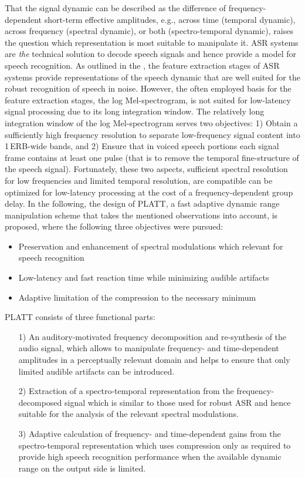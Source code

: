 \documentclass[10pt,a4paper,twocolumn]{article}
\begin{document}
That the signal dynamic can be described as the difference of frequency-dependent short-term effective amplitudes, e.g., across time (temporal dynamic), across frequency (spectral dynamic), or both (spectro-temporal dynamic), raises the question which representation is most suitable to manipulate it.
%
ASR systems are \emph{the} technical solution to decode speech signals and hence provide a model for speech recognition.
%
As outlined in the , the feature extraction stages of ASR systems provide representations of the speech dynamic that are well suited for the robust recognition of speech in noise.
%
However, the often employed basis for the feature extraction stages, the log Mel-spectrogram, is not suited for low-latency signal processing due to its long integration window.
%
The relatively long integration window of the log Mel-spectrogram serves two objectives: 1) Obtain a sufficiently high frequency resolution to separate low-frequency signal content into 1\,ERB-wide bands, and 2) Ensure that in voiced speech portions each signal frame contains at least one pulse (that is to remove the temporal fine-structure of the speech signal).
%
Fortunately, these two aspects, sufficient spectral resolution for low frequencies and limited temporal resolution, are compatible can be optimized for low-latency processing at the cost of a frequency-dependent group delay.
%
In the following, the design of PLATT, a fast adaptive dynamic range manipulation scheme that takes the mentioned observations into account, is proposed, where the following three objectives were pursued:
\begin{itemize}
	\item Preservation and enhancement of spectral modulations which relevant for speech recognition
	\item Low-latency and fast reaction time while minimizing audible artifacts
	\item Adaptive limitation of the compression to the necessary minimum
\end{itemize}
%
PLATT consists of three functional parts:
\begin{itemize}
	\item[1)] An auditory-motivated frequency decomposition and re-synthesis of the audio signal, which allows to manipulate frequency- and time-dependent amplitudes in a perceptually relevant domain and helps to ensure that only limited audible artifacts can be introduced.
	\item[2)] Extraction of a spectro-temporal representation from the frequency-decomposed signal which is similar to those used for robust ASR and hence suitable for the analysis of the relevant spectral modulations.
	\item[3)] Adaptive calculation of frequency- and time-dependent gains from the spectro-temporal representation which uses compression only as required to provide high speech recognition performance when the available dynamic range on the output side is limited.
\end{itemize}
\end{document}
